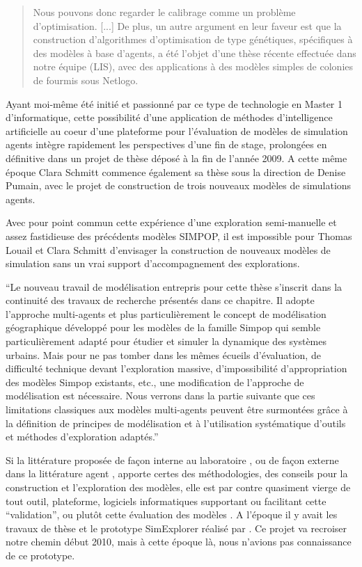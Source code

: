 \blockquote[{\cite[139-141]{Louail2010}}]{Nous pouvons donc regarder le calibrage comme un problème d’optimisation. [...] De plus, un autre argument en leur faveur est que la construction d’algorithmes d’optimisation de type génétiques, spécifiques à des modèles à base d’agents, a été l’objet d’une thèse récente effectuée dans notre équipe (LIS), avec des applications à des modèles simples de colonies de fourmis sous Netlogo.}

Ayant moi-même été initié et passionné par ce type de technologie en Master 1 d'informatique, cette possibilité d'une application de méthodes d'intelligence artificielle au coeur d'une plateforme pour l'évaluation de modèles de simulation agents intègre rapidement les perspectives d'une fin de stage, prolongées en définitive dans un projet de thèse déposé à la fin de l'année 2009. A cette même époque Clara Schmitt commence également sa thèse sous la direction de Denise Pumain, avec le projet de construction de trois nouveaux modèles de simulations agents.

Avec pour point commun cette expérience d'une exploration semi-manuelle et assez fastidieuse des précédents modèles SIMPOP, il est impossible pour Thomas Louail et Clara Schmitt d'envisager la construction de nouveaux modèles de simulation sans un vrai support d'accompagnement des explorations.

\enquote{Le nouveau travail de modélisation entrepris pour cette thèse s’inscrit dans la continuité des travaux de recherche présentés dans ce chapitre. Il adopte l’approche multi-agents et plus particulièrement le concept de modélisation géographique développé pour les modèles de la famille Simpop qui semble particulièrement adapté pour étudier et simuler la dynamique des systèmes urbains. Mais pour ne pas tomber dans les mêmes écueils d’évaluation, de difficulté technique devant l’exploration massive, d’impossibilité d’appropriation des modèles Simpop existants, etc., une modification de l’approche de modélisation est nécessaire. Nous verrons dans la partie suivante que ces limitations classiques aux modèles multi-agents peuvent être surmontées grâce à la définition de principes de modélisation et à l’utilisation systématique d’outils et méthodes d’exploration adaptés.} \autocite[113]{Schmitt2014}

Si la littérature proposée de façon interne au laboratoire \autocite{Mathian2014}, ou de façon externe dans la littérature agent \autocites{Amblard2006, Sargent2010, Gilbert2008}, apporte certes des méthodologies, des conseils pour la construction et l'exploration des modèles, elle est par contre quasiment vierge de tout outil, plateforme, logiciels informatiques supportant ou facilitant cette \enquote{validation}, ou plutôt cette évaluation des modèles \autocite{Amblard2006}. A l'époque il y avait les travaux de thèse et le prototype SimExplorer réalisé par \textcite{Amblard2003}. Ce projet va recroiser notre chemin début 2010, mais à cette époque là, nous n'avions pas connaissance de ce prototype.


